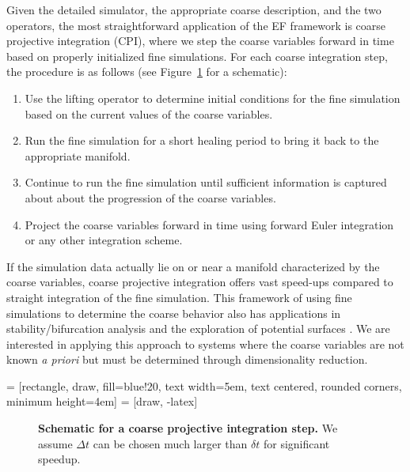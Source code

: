 \documentclass[12pt]{article}
\begin{document}
Given the detailed simulator, the appropriate coarse description, and the two operators, the most straightforward application of the EF framework is coarse projective integration (CPI), where we step the coarse variables forward in time based on properly initialized fine simulations. For each coarse integration step, the procedure is as follows (see Figure~\ref{fig:cpi} for a schematic):  \vspace{1mm}

\begin{enumerate}
\item Use the lifting operator to determine initial conditions for the fine simulation based on the current values of the coarse variables.
\item Run the fine simulation for a short healing period to bring it back to the appropriate manifold.
\item Continue to run the fine simulation until sufficient information is captured about about the progression of the coarse variables.
\item Project the coarse variables forward in time using forward Euler integration or any other integration scheme.
\end{enumerate}

If the simulation data actually lie on or near a manifold characterized by the coarse variables, coarse projective integration offers vast speed-ups compared to straight integration of the fine simulation. This framework of using fine simulations to determine the coarse behavior also has applications in stability/bifurcation analysis \cite{Theodoropoulos2000} \cite{Gear2002} and the exploration of potential surfaces \cite{Frewen2009}. We are interested in applying this approach to systems where the coarse variables are not known \textit{a priori} but must be determined through dimensionality reduction. \vspace{1mm}

 = [rectangle, draw, fill=blue!20, 
    text width=5em, text centered, rounded corners, minimum height=4em]
 = [draw, -latex]
\begin{figure}[here]
\caption{\textbf{Schematic for a coarse projective integration step.} We assume $\Delta t$ can be chosen much larger than $\delta t$ for significant speedup.}
\label{fig:cpi}
\end{figure}
\end{document}
